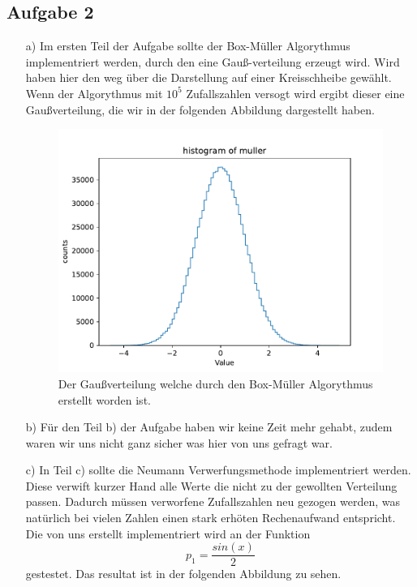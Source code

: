       \subsection{Aufgabe 2}
      \begin{itemize}
        \item[a)]
      Im ersten Teil der Aufgabe sollte der Box-Müller Algorythmus implementriert werden, durch den eine Gauß-verteilung erzeugt wird.
      Wird haben hier den weg über die Darstellung auf einer Kreisschheibe gewählt.
      Wenn der Algorythmus mit $10^5$ Zufallszahlen versogt wird ergibt dieser eine Gaußverteilung, die wir in der folgenden Abbildung dargestellt haben.

      \begin{figure}
        \centering
        \includegraphics[width=\textwidth]{images/muller_hist.pdf}
        \caption{Der Gaußverteilung welche durch den Box-Müller Algorythmus erstellt worden ist.}
      \end{figure}
      \FloatBarrier
      \item[b)]
      Für den Teil b) der Aufgabe haben wir keine Zeit mehr gehabt, zudem waren wir uns nicht ganz sicher was hier von uns gefragt war.
      \item[c)]
      In Teil c) sollte die Neumann Verwerfungsmethode implementriert werden.
      Diese verwift kurzer Hand alle Werte die nicht zu der gewollten Verteilung passen.
      Dadurch müssen verworfene Zufallszahlen neu gezogen werden, was natürlich bei vielen Zahlen einen stark erhöten Rechenaufwand entspricht.
      Die von uns erstellt implementriert wird an der Funktion 
      \begin{equation}
        p_1 = \frac{sin(x)}{2}
      \end{equation}
      gestestet.
      Das resultat ist in der folgenden Abbildung zu sehen.


\end{itemize}
